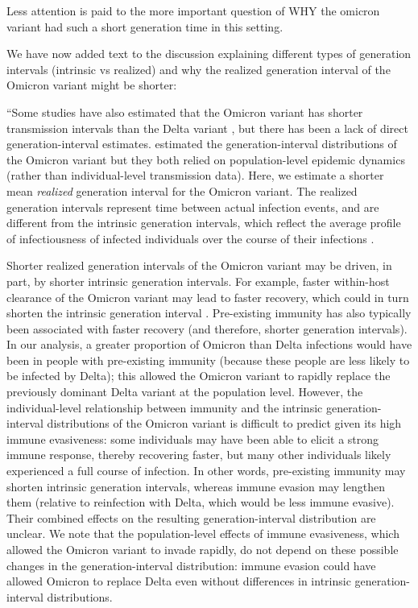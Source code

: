 \documentclass[12pt]{article}
\newcommand{\revtext}{\textsf}
\begin{document}
\revtext{Less attention is paid to the more important question of WHY the omicron variant had such a short generation time in this setting.}

We have now added text to the discussion explaining different types of generation intervals (intrinsic vs realized) and why the realized generation interval of the Omicron variant might be shorter:

``Some studies have also estimated that the Omicron variant has shorter transmission intervals than the Delta variant \citep{abbott2022test,kremer2022observed,song2022serial}, but there has been a lack of direct generation-interval estimates.
\cite{ito2022estimating,selby2022generation} estimated the generation-interval distributions of the Omicron variant but they both relied on population-level epidemic dynamics (rather than individual-level transmission data).
Here, we estimate a shorter mean \emph{realized} generation interval for the Omicron variant.
The realized generation intervals represent time between actual infection events, and are different from the intrinsic generation intervals, which reflect the average profile of infectiousness of infected individuals over the course of their infections \citep{champredon2015intrinsic}.

Shorter realized generation intervals of the Omicron variant may be driven, in part, by shorter intrinsic generation intervals.
For example, faster within-host clearance of the Omicron variant \citep{hay2022viral} may lead to faster recovery, which could in turn shorten the intrinsic generation interval \citep{roberts2007model}.
Pre-existing immunity has also typically been associated with faster recovery \citep{kissler2021viral} (and therefore, shorter generation intervals).
In our analysis, a greater proportion of Omicron than Delta infections would have been in people with pre-existing immunity (because these people are less likely to be infected by Delta);
this allowed the Omicron variant to rapidly replace the previously dominant Delta variant at the population level.
However, the individual-level relationship between immunity and the intrinsic generation-interval distributions of the Omicron variant is difficult to predict given its high immune evasiveness:
some individuals may have been able to elicit a strong immune response, thereby recovering faster, but many other individuals likely experienced a full course of infection.
In other words, pre-existing immunity may shorten intrinsic generation intervals, whereas immune evasion may lengthen them (relative to reinfection with Delta, which would be less immune evasive).
Their combined effects on the resulting generation-interval distribution are unclear.
We note that the population-level effects of immune evasiveness, which allowed the Omicron variant to invade rapidly, do not depend on these possible changes in the generation-interval distribution:
immune evasion could have allowed Omicron to replace Delta even without differences in intrinsic generation-interval distributions.
\end{document}
